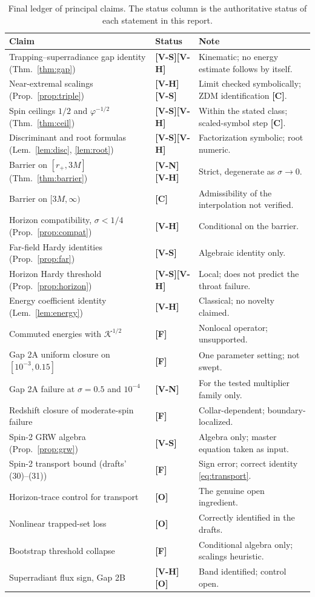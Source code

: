\documentclass[11pt, a4paper]{article}
\newcommand{\VS}{\textcolor{vs}{\textbf{[V-S]}}}
\newcommand{\VN}{\textcolor{vn}{\textbf{[V-N]}}}
\newcommand{\VH}{\textcolor{vh}{\textbf{[V-H]}}}
\newcommand{\CC}{\textcolor{cc}{\textbf{[C]}}}
\newcommand{\FF}{\textcolor{ff}{\textbf{[F]}}}
\newcommand{\OO}{\textcolor{oo}{\textbf{[O]}}}
\theoremstyle{remark}
\theoremstyle{definition}
\begin{document}
\begin{table}[H]
\centering
\caption{Final ledger of principal claims. The status column is the authoritative status of each statement in this report.}
\label{tab:ledger}
\small
\begin{tabular}{@{}p{5.0cm}p{2.2cm}p{7.6cm}@{}}
\toprule
Claim & Status & Note \\
\midrule
Trapping--superradiance gap identity (Thm.~\ref{thm:gap}) & \VS\VH & Kinematic; no energy estimate follows by itself. \\
Near-extremal scalings (Prop.~\ref{prop:triple}) & \VH\VS & Limit checked symbolically; ZDM identification \CC. \\
Spin ceilings $1/2$ and $\varphi^{-1/2}$ (Thm.~\ref{thm:ceil}) & \VS\VH & Within the stated class; scaled-symbol step \CC. \\
Discriminant and root formulas (Lem.~\ref{lem:disc}, \ref{lem:root}) & \VS\VH & Factorization symbolic; root numeric. \\
Barrier on $[r_+,3M]$ (Thm.~\ref{thm:barrier}) & \VN\VH & Strict, degenerate as $\sigma\to0$. \\
Barrier on $[3M,\infty)$ & \CC & Admissibility of the interpolation not verified. \\
Horizon compatibility, $\sigma<1/4$ (Prop.~\ref{prop:compat}) & \VH & Conditional on the barrier. \\
Far-field Hardy identities (Prop.~\ref{prop:far}) & \VS & Algebraic identity only. \\
Horizon Hardy threshold (Prop.~\ref{prop:horizon}) & \VS\VH & Local; does not predict the throat failure. \\
Energy coefficient identity (Lem.~\ref{lem:energy}) & \VH & Classical; no novelty claimed. \\
Commuted energies with $\mathcal{K}^{1/2}$ & \FF & Nonlocal operator; unsupported. \\
Gap 2A uniform closure on $[10^{-3},0.15]$ & \FF & One parameter setting; not swept. \\
Gap 2A failure at $\sigma=0.5$ and $10^{-4}$ & \VN & For the tested multiplier family only. \\
Redshift closure of moderate-spin failure & \FF & Collar-dependent; boundary-localized. \\
Spin-2 GRW algebra (Prop.~\ref{prop:grw}) & \VS & Algebra only; master equation taken as input. \\
Spin-2 transport bound (drafts' (30)--(31)) & \FF & Sign error; correct identity \eqref{eq:transport}. \\
Horizon-trace control for transport & \OO & The genuine open ingredient. \\
Nonlinear trapped-set loss & \OO & Correctly identified in the drafts. \\
Bootstrap threshold collapse & \FF & Conditional algebra only; scalings heuristic. \\
Superradiant flux sign, Gap 2B & \VH\OO & Band identified; control open. \\
\bottomrule
\end{tabular}
\end{table}
\end{document}
